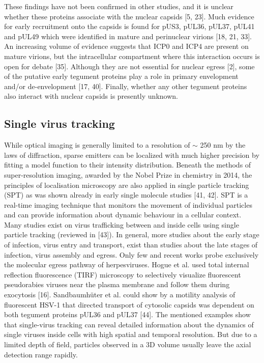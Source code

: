 These findings have not been confirmed in other studies, and it is unclear whether these proteins associate with the nuclear capsids [5, 23].
Much evidence for early recruitment onto the capsids is found for pUS3, pUL36, pUL37, pUL41 and pUL49 which were identified in mature and perinuclear virions [18, 21, 33].
An increasing volume of evidence suggests that ICP0 and ICP4 are present on mature virions, but the intracellular compartment where this interaction occurs is open for debate [35].
Although they are not essential for nuclear egress [2], some of the putative early tegument proteins play a role in primary envelopment and/or de-envelopment [17, 40].
Finally, whether any other tegument proteins also interact with nuclear capsids is presently unknown.

\subsection{Single virus tracking}
While optical imaging is generally limited to a resolution of $\sim$ 250 nm by the laws of diffraction, sparse emitters can be localized with much higher precision by fitting a model function to their intensity distribution.
Beneath the methods of super-resolution imaging, awarded by the Nobel Prize in chemistry in 2014, the principles of localisation microscopy are also applied in single particle tracking (SPT) as was shown already in early single molecule studies [41, 42].
SPT is a real-time imaging technique that monitors the movement of individual particles and can provide information about dynamic behaviour in a cellular context.
Many studies exist on virus trafficking between and inside cells using single particle tracking (reviewed in [43]).
In general, more studies about the early stage of infection, virus entry and transport, exist than studies about the late stages of infection, virus assembly and egress.
Only few and recent works probe exclusively the molecular egress pathway of herpesviruses.
Hogue et al.
used total internal reflection fluorescence (TIRF) microscopy to selectively visualize fluorescent pseudorabies viruses near the plasma membrane and follow them during exocytosis [16].
Sandbaumhüter et al. could show by a motility analysis of fluorescent HSV-1 that directed transport of cytosolic capsids was dependent on both tegument proteins pUL36 and pUL37 [44].
The mentioned examples show that single-virus tracking can reveal detailed information about the dynamics of single viruses inside cells with high spatial and temporal resolution.
But due to a limited depth of field, particles observed in a 3D volume usually leave the axial detection range rapidly.
